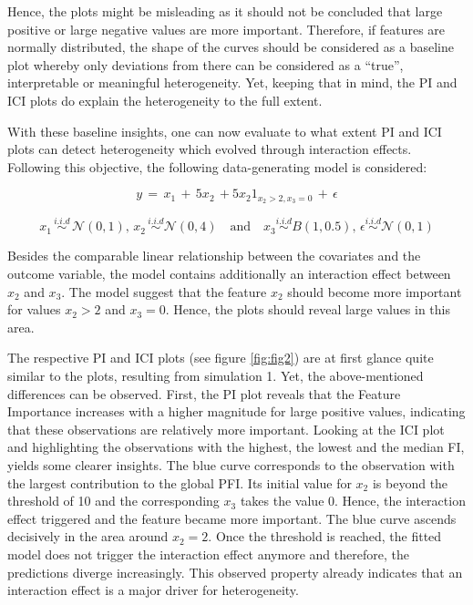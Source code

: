 \documentclass[]{krantz}
\begin{document}
Hence, the plots might be misleading as it should not be concluded that
large positive or large negative values are more important. Therefore,
if features are normally distributed, the shape of the curves should be
considered as a baseline plot whereby only deviations from there can be
considered as a ``true'', interpretable or meaningful heterogeneity.
Yet, keeping that in mind, the PI and ICI plots do explain the
heterogeneity to the full extent.

With these baseline insights, one can now evaluate to what extent PI and
ICI plots can detect heterogeneity which evolved through interaction
effects. Following this objective, the following data-generating model
is considered:

\[ y \, = \, x_{1} \,  + \, 5x_{2} \, + 5x_{2}  1_{x_2 > 2, x_3 = 0} \, + \, \epsilon\]

\[ x_{1} \, \overset{i.i.d}{\sim} \, \mathcal{N}(0,1), \, x_{2} \, \overset{i.i.d}{\sim}  \mathcal{N}(0, 4) \quad \text{and} \quad x_{3} \overset{i.i.d}{\sim} B(1, 0.5),\,  \epsilon \overset{i.i.d}{\sim} \mathcal{N}(0, 1)\]

Besides the comparable linear relationship between the covariates and
the outcome variable, the model contains additionally an interaction
effect between \(x_{2}\) and \(x_{3}\). The model suggest that the
feature \(x_{2}\) should become more important for values \(x_{2} > 2\)
and \(x_{3} = 0\). Hence, the plots should reveal large values in this
area.

The respective PI and ICI plots (see figure \ref{fig:fig2}) are at first
glance quite similar to the plots, resulting from simulation 1. Yet, the
above-mentioned differences can be observed. First, the PI plot reveals
that the Feature Importance increases with a higher magnitude for large
positive values, indicating that these observations are relatively more
important. Looking at the ICI plot and highlighting the observations
with the highest, the lowest and the median FI, yields some clearer
insights. The blue curve corresponds to the observation with the largest
contribution to the global PFI. Its initial value for \(x_{2}\) is
beyond the threshold of 10 and the corresponding \(x_{3}\) takes the
value 0. Hence, the interaction effect triggered and the feature became
more important. The blue curve ascends decisively in the area around
\(x_{2} = 2\). Once the threshold is reached, the fitted model does not
trigger the interaction effect anymore and therefore, the predictions
diverge increasingly. This observed property already indicates that an
interaction effect is a major driver for heterogeneity.
\end{document}
